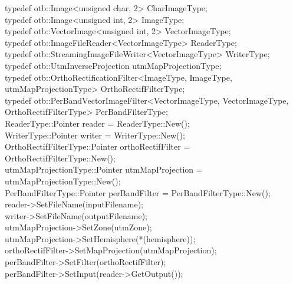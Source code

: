 \begin{scriptsize}
\indent typedef otb::Image<unsigned char, 2>                    CharImageType;\\
\indent typedef otb::Image<unsigned int, 2>                     ImageType;\\
\indent typedef otb::VectorImage<unsigned int, 2>               VectorImageType;\\
\indent typedef otb::ImageFileReader<VectorImageType>           ReaderType;\\
\indent typedef otb::StreamingImageFileWriter<VectorImageType>  WriterType;\\
\indent typedef otb::UtmInverseProjection                       utmMapProjectionType;\\
\indent typedef otb::OrthoRectificationFilter<ImageType, ImageType, utmMapProjectionType>              OrthoRectifFilterType;\\
\indent typedef otb::PerBandVectorImageFilter<VectorImageType, VectorImageType, OrthoRectifFilterType> PerBandFilterType;\\

\indent ReaderType::Pointer            reader            = ReaderType::New();\\
\indent WriterType::Pointer	       writer            = WriterType::New();\\
\indent OrthoRectifFilterType::Pointer orthoRectifFilter = OrthoRectifFilterType::New();\\
\indent utmMapProjectionType::Pointer  utmMapProjection  = utmMapProjectionType::New();\\
\indent PerBandFilterType::Pointer     perBandFilter     = PerBandFilterType::New();\\

\indent reader->SetFileName(inputFilename);\\
\indent writer->SetFileName(outputFilename);\\
\indent utmMapProjection->SetZone(utmZone);\\
\indent utmMapProjection->SetHemisphere(*(hemisphere));\\
\indent orthoRectifFilter->SetMapProjection(utmMapProjection);\\
\indent perBandFilter->SetFilter(orthoRectifFilter);\\
\indent perBandFilter->SetInput(reader->GetOutput());\\


\end{scriptsize}
